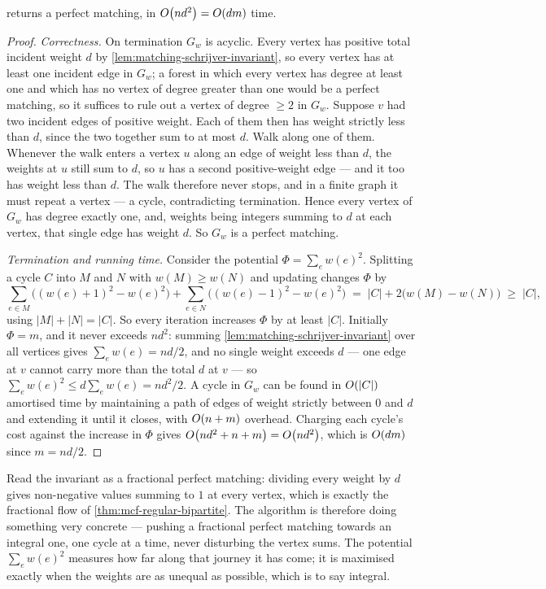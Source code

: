 \begin{theorem}\label{thm:matching-schrijver}
 returns a perfect matching, in
$O\!\left(nd^2\right) = O\!\left(dm\right)$ time.
\end{theorem}

\begin{proof}
\emph{Correctness.} On termination $G_w$ is acyclic. Every vertex has positive
total incident weight $d$ by \cref{lem:matching-schrijver-invariant}, so every
vertex has at least one incident edge in $G_w$; a forest in which every vertex
has degree at least one and which has no vertex of degree greater than one would
be a perfect matching, so it suffices to rule out a vertex of degree $\ge 2$ in
$G_w$. Suppose $v$ had two incident edges of positive weight. Each of them then has
weight strictly less than $d$, since the two together sum to at most $d$. Walk
along one of them. Whenever the walk enters a vertex $u$ along an edge of weight
less than $d$, the weights at $u$ still sum to $d$, so $u$ has a second
positive-weight edge --- and it too has weight less than $d$. The walk therefore
never stops, and in a finite graph it must repeat a vertex --- a cycle,
contradicting termination. Hence every vertex of $G_w$ has degree exactly one,
and, weights being integers summing to $d$ at each vertex, that single edge has
weight $d$. So $G_w$ is a perfect matching.

\emph{Termination and running time.} Consider the potential
$\Phi = \sum_{e} w(e)^2$. Splitting a cycle $C$ into $M$ and $N$ with
$w(M) \ge w(N)$ and updating changes $\Phi$ by
\[ \sum_{e \in M}\bigl((w(e)+1)^2 - w(e)^2\bigr)
 + \sum_{e \in N}\bigl((w(e)-1)^2 - w(e)^2\bigr)
 \;=\; |C| + 2\bigl(w(M) - w(N)\bigr) \;\ge\; |C|, \]
using $|M| + |N| = |C|$. So every iteration increases $\Phi$ by at least $|C|$.
Initially $\Phi = m$, and it never exceeds $nd^2$: summing
\cref{lem:matching-schrijver-invariant} over all vertices gives
$\sum_e w(e) = nd/2$, and no single weight exceeds $d$ --- one edge at $v$
cannot carry more than the total $d$ at $v$ --- so
$\sum_e w(e)^2 \le d \sum_e w(e) = nd^2/2$. A cycle in $G_w$ can be found in
$O\!\left(|C|\right)$ amortised time by maintaining a path of edges of weight strictly
between $0$ and $d$ and extending it until it closes, with $O\!\left(n+m\right)$
overhead. Charging each cycle's cost against the increase in $\Phi$ gives
$O\!\left(nd^2 + n + m\right) = O\!\left(nd^2\right)$, which is $O\!\left(dm\right)$ since
$m = nd/2$.
\end{proof}

\begin{intuition}
Read the invariant as a fractional perfect matching: dividing every weight by
$d$ gives non-negative values summing to $1$ at every vertex, which is exactly
the fractional flow of \cref{thm:mcf-regular-bipartite}. The algorithm is
therefore doing something very concrete --- pushing a fractional perfect
matching towards an integral one, one cycle at a time, never disturbing the
vertex sums. The potential $\sum_e w(e)^2$ measures how far along that journey
it has come; it is maximised exactly when the weights are as unequal as
possible, which is to say integral.
\end{intuition}

